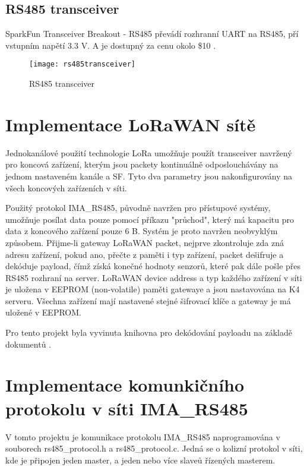 \subsection{RS485 transceiver}
SparkFun Transceiver Breakout - RS485 převádí rozhranní UART na RS485, pří vstupním napětí 3.3 V. A je dostupný za cenu okolo \$10 \cite{rs485tr}.

\begin{figure}[!h]
    \centering
    \texttt{[image: rs485transceiver]}
    \caption{RS485 transceiver \cite{rs485tr}}
    \label{fig:rs485transceiver}
\end{figure}



\newpage
\section{Implementace LoRaWAN sítě}
Jednokanálové použití technologie LoRa umožňuje použít transceiver navržený pro koncová zařízení, 
kterým jsou packety kontinuálně odposlouchávány na jednom nastaveném kanále a SF. Tyto dva parametry  jsou nakonfigurovány na všech koncových zařízeních v síti.

Použitý protokol IMA\_RS485, původně navržen pro přístupové systémy, umožňuje posílat data pouze pomocí příkazu "průchod", který má kapacitu pro data z koncového zařízení pouze 6 B. Systém je proto navržen neobvyklým způsobem. Přijme-li gateway LoRaWAN packet, nejprve zkontroluje zda zná adresu zařízení, pokud ano, přečte z paměti i typ zařízení, packet dešifruje a dekóduje payload, čímž získá konečné hodnoty senzorů, které pak dále pošle přes RS485 rozhraní na server.
LoRaWAN device address a typ každého zařízení v síti je uložena v EEPROM (non-volatile) paměti gatewaye a jsou nastavována na K4 serveru.
Všechna zařízení mají nastavené stejné šifrovací klíče a gateway je má uložené v EEPROM.

Pro tento projekt byla vyvinuta knihovna pro dekódování payloadu na základě dokumentů \cite{lwSpec} \cite{lwSecur}.


\section{Implementace komunkičního protokolu v síti IMA\_RS485}
V tomto projektu je komunikace protokolu IMA\_RS485 naprogramována v souborech rs485\_protocol.h a rs485\_protocol.c. Jedná se o kolizní protokol v síti, kde je připojen jeden master, a jeden nebo více slaveů řízených masterem.

